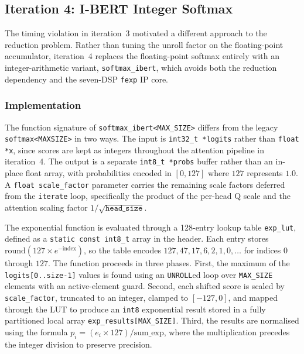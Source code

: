 \subsection{Iteration 4: I-BERT Integer Softmax}
\label{subsec:softmax_ibert}

The timing violation in iteration~3 motivated a different approach to the
reduction problem. Rather than tuning the unroll factor on the floating-point
accumulator, iteration~4 replaces the floating-point softmax entirely with an
integer-arithmetic variant, \texttt{softmax\_ibert}, which avoids both the
reduction dependency and the seven-DSP \texttt{fexp} IP core.

\subsubsection{Implementation}
\label{subsubsec:softmax_ibert_impl}

The function signature of \texttt{softmax\_ibert<MAX\_SIZE>} differs from the
legacy \texttt{softmax<MAXSIZE>} in two ways. The input is \texttt{int32\_t
*logits} rather than \texttt{float *x}, since scores are kept as integers
throughout the attention pipeline in iteration~4. The output is a separate
\texttt{int8\_t *probs} buffer rather than an in-place float array, with
probabilities encoded in $[0, 127]$ where $127$ represents $1.0$. A
\texttt{float scale\_factor} parameter carries the remaining scale factors
deferred from the \texttt{iterate} loop, specifically the product of the
per-head Q scale and the attention scaling factor $1/\sqrt{\texttt{head\_size}}$.

The exponential function is evaluated through a 128-entry lookup table
\texttt{exp\_lut}, defined as a \texttt{static const int8\_t} array in the
header. Each entry stores $\text{round}(127 \times e^{-\text{index}})$, so
the table encodes $127, 47, 17, 6, 2, 1, 0, \ldots$ for indices $0$ through
$127$. The function proceeds in three phases. First, the maximum of the
\texttt{logits[0..size-1]} values is found using an \texttt{UNROLL}ed loop
over \texttt{MAX\_SIZE} elements with an active-element guard. Second, each
shifted score is scaled by \texttt{scale\_factor}, truncated to an integer,
clamped to $[-127, 0]$, and mapped through the LUT to produce an \texttt{int8}
exponential result stored in a fully partitioned local array
\texttt{exp\_results[MAX\_SIZE]}. Third, the results are normalised using the
formula $p_i = (e_i \times 127) / \text{sum\_exp}$, where the multiplication
precedes the integer division to preserve precision.

